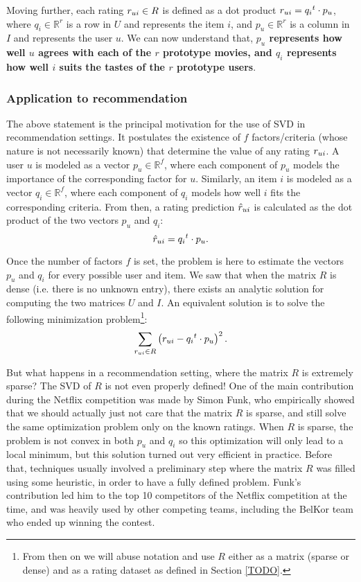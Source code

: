 Moving further, each rating $r_{ui} \in R$ is defined as a dot product $r_{ui} =
{q_i}^t \cdot p_u$, where $q_i \in \mathbb{R}^r$ is a row in $U$ and represents
the item $i$, and $p_u \in \mathbb{R}^r$ is a column in $I$ and represents the
user $u$. We can now understand that, \textbf{$p_u$ represents how well $u$
agrees with each of the $r$ prototype movies, and $q_i$ represents how well $i$
suits the tastes of the $r$ prototype users}.

\subsubsection{Application to recommendation}

The above statement is the principal motivation for the use of SVD in recommendation
settings. It postulates the existence of $f$ factors/criteria (whose nature is
not necessarily known) that determine the value of any rating $r_{ui}$.  A user
$u$ is modeled as a vector $p_u \in \mathbb{R}^f$, where each component of
$p_u$ models the importance of the corresponding factor for $u$.  Similarly, an
item $i$ is modeled as a vector $q_i \in \mathbb{R}^f$, where each component of
$q_i$ models how well $i$ fits the corresponding criteria.  From then, a rating
prediction $\hat{r}_{ui}$ is calculated as the dot product of the two vectors $p_u$
and $q_i$:
$$\hat{r}_{ui} = {q_i}^t \cdot p_u.$$

Once the number of factors $f$ is set, the problem is here to estimate the
vectors $p_u$ and $q_i$ for every possible user and item. We saw that when the
matrix $R$ is dense (i.e. there is no unknown entry), there exists an analytic
solution for computing the two matrices $U$ and $I$. An equivalent solution is
to solve the following minimization problem\footnote{From then on we will abuse
notation and use $R$ either as a matrix (sparse or dense) and as a rating
dataset as defined in Section \ref{TODO}.}:
$$
\sum_{r_{ui} \in R} \left(r_{ui} - {q_i}^t \cdot p_u \right)^2.
$$

But what happens in a recommendation setting, where the matrix $R$ is extremely
sparse? The SVD of $R$ is not even properly defined! One of the main
contribution during the Netflix competition was made by Simon Funk, who
empirically showed that we should actually just not care that the matrix $R$ is
sparse, and still solve the same optimization problem only on the known
ratings.  When $R$ is sparse, the problem is not convex in both $p_u$ and $q_i$
so this optimization will only lead to a local minimum,
but this solution turned out very efficient in practice. Before that,
techniques usually involved  a preliminary step where the matrix $R$ was filled
using some heuristic, in order to have a fully defined problem. Funk's
contribution led him to the top 10 competitors of the Netflix competition at
the time, and was heavily used by other competing teams, including the BelKor
team who ended up winning the contest.


